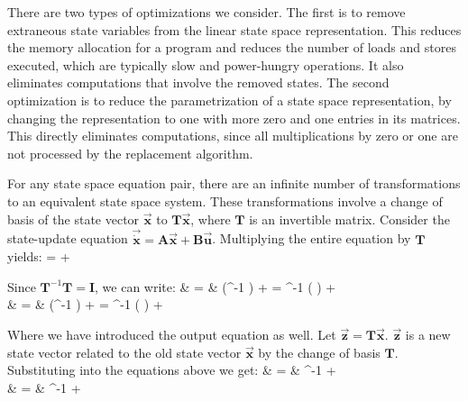 \label{sec:optimization}

There are two types of optimizations we consider.  The first is to
remove extraneous state variables from the linear state space
representation. This reduces the memory allocation for a program and
reduces the number of loads and stores executed, which are typically
slow and power-hungry operations. It also eliminates computations that
involve the removed states.  The second optimization is to reduce the
parametrization of a state space representation, by changing the
representation to one with more zero and one entries in its
matrices. This directly eliminates computations, since all
multiplications by zero or one are not processed by the replacement
algorithm.


    For any state space equation pair, there are an infinite
number of transformations to an equivalent state space system.
These transformations involve a change of basis of the state
vector $\vec{\mathbf{x}}$ to $\mathbf{T} \vec{\mathbf{x}}$, where
$\mathbf{T}$ is an invertible matrix. Consider the state-update
equation $\vec{\dot{\mathbf{x}}} = \mathbf{A} \vec{\mathbf{x}} +
\mathbf{B} \vec{\mathbf{u}}$. Multiplying the entire equation by
$\mathbf{T}$ yields:
\starteqnstar
{}  =   +
 
\doneeqnstar

\vspace{-9pt} Since $\mathbf{T}^{-1} \mathbf{T} = \mathbf{I}$, we can write:
\starteqnstar
{}  & = & 
(^{-1} )  + 
 = 
^{-1} ( ) +   \\
 & = &  (^{-1} )
 +   = 
^{-1} ( ) + 
\doneeqnstar

\vspace{-9pt} Where we have introduced the output equation as well. Let
$\vec{\mathbf{z}} = \mathbf{T} \vec{\mathbf{x}}$.
$\vec{\mathbf{z}}$ is a new state vector related to the old state
vector $\vec{\mathbf{x}}$ by the change of basis $\mathbf{T}$.
Substituting into the equations above we get:
\starteqnstar
{} & = &  ^{-1}  +   \\
 & = &  ^{-1}
+ 
\doneeqnstar

